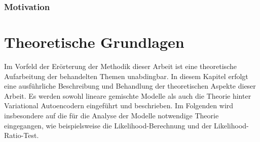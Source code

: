 \documentclass[%
thesis=student,%
coverpage=false,%
titlepage=false,%
headmarks=true, %
german,%
font=libertine, %
math=newpxtx, %
BCOR=5mm,%
coverBCOR=11mm%
]{tumbook}
\theoremstyle{break}
\begin{document}
\subsection{Motivation}


\chapter{Theoretische Grundlagen}
Im Vorfeld der Erörterung der Methodik dieser Arbeit ist eine theoretische Aufarbeitung der behandelten Themen unabdingbar. In diesem Kapitel erfolgt eine ausführliche Beschreibung und Behandlung der theoretischen Aspekte dieser Arbeit. Es werden sowohl lineare gemischte Modelle als auch die Theorie hinter Variational Autoencodern eingeführt und beschrieben. Im Folgenden wird insbesondere auf die für die Analyse der Modelle notwendige Theorie eingegangen, wie beispielsweise die Likelihood-Berechnung und der Likelihood-Ratio-Test.



\end{document}
